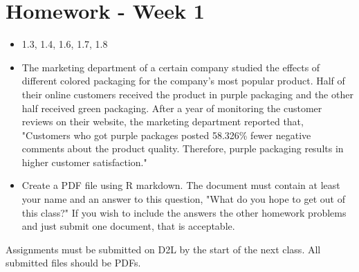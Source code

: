 \documentclass{article}
\begin{document}
\flushleft

\section*{Homework - Week 1}
\begin{itemize}
\item {} 1.3, 1.4, 1.6, 1.7, 1.8

\item The marketing department of a certain company studied the effects of different colored packaging for the company's most popular product. Half of their online customers received the product in purple packaging and the other half received green packaging. After a year of monitoring the customer reviews on their website, the marketing department reported that, "Customers who got purple packages posted 58.326\% fewer negative comments about the product quality. Therefore, purple packaging results in higher customer satisfaction."\\

\item Create a PDF file using R markdown. The document must contain at least your name and an answer to this question, "What do you hope to get out of this class?" If you wish to include the answers the other homework problems and just submit one document, that is acceptable.
\end{itemize}

Assignments must be submitted on D2L by the start of the next class. All submitted files should be PDFs.
\end{document}
